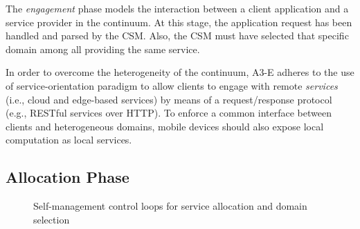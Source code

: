 The \textit{engagement} phase models the interaction between a client application and a service provider in the continuum. At this stage, the application request has been handled and parsed by the CSM. Also, the CSM must have selected that specific domain among all providing the same service. %

In order to overcome the heterogeneity of the continuum, A3-E adheres to the use of service-orientation paradigm to allow clients to engage with remote \textit{services} (i.e., cloud and edge-based services) by means of a request/response protocol (e.g., RESTful services over HTTP). To enforce a common interface between clients and heterogeneous domains, mobile devices should also expose local computation as local services. 


\subsection{Allocation Phase}\label{sec:A3-E-allocation}

\begin{figure}[thbp]
	\centering
	\captionsetup[subfigure]{width=0.4\textwidth}	
	\null\hfill
	\captionsetup[subfigure]{width=0.4\textwidth}	
	\hfill
	\hfill\null
	\caption{Self-management control loops for service allocation and domain selection}\label{fig:allocation-loops}
\end{figure}

